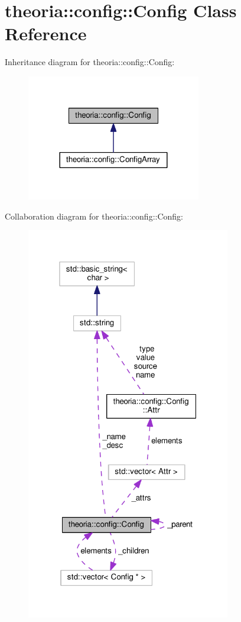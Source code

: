 \hypertarget{classtheoria_1_1config_1_1Config}{\section{theoria\+:\+:config\+:\+:Config Class Reference}
\label{classtheoria_1_1config_1_1Config}
}


Inheritance diagram for theoria\+:\+:config\+:\+:Config\+:
\nopagebreak
\begin{figure}[H]
\begin{center}
\leavevmode
\includegraphics[width=216pt]{classtheoria_1_1config_1_1Config__inherit__graph}
\end{center}
\end{figure}


Collaboration diagram for theoria\+:\+:config\+:\+:Config\+:
\nopagebreak
\begin{figure}[H]
\begin{center}
\leavevmode
\includegraphics[width=253pt]{classtheoria_1_1config_1_1Config__coll__graph}
\end{center}
\end{figure}

